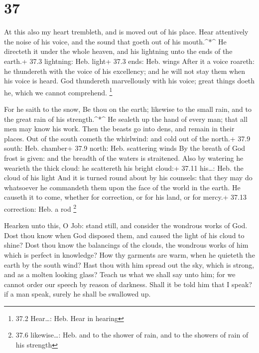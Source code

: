 \hypertarget{section-36}{%
\section{37}\label{section-36}}

 At this also my heart trembleth, and is moved out of his
place.  Hear attentively the noise of his voice, and the
sound that goeth out of his mouth.\^{}*\^{}  He directeth it
under the whole heaven, and his lightning unto the ends of the earth.+
37.3 lightning: Heb. light+ 37.3 ends: Heb. wings  After it
a voice roareth: he thundereth with the voice of his excellency; and he
will not stay them when his voice is heard.  God thundereth
marvellously with his voice; great things doeth he, which we cannot
comprehend. \footnote{37.2 Hear\ldots: Heb. Hear in hearing}

 For he saith to the snow, Be thou on the earth; likewise to
the small rain, and to the great rain of his strength.\^{}*\^{}
 He sealeth up the hand of every man; that all men may know
his work.  Then the beasts go into dens, and remain in their
places.  Out of the south cometh the whirlwind: and cold out
of the north.+ 37.9 south: Heb. chamber+ 37.9 north: Heb. scattering
winds  By the breath of God frost is given: and the breadth
of the waters is straitened.  Also by watering he wearieth
the thick cloud: he scattereth his bright cloud:+ 37.11 his\ldots: Heb.
the cloud of his light  And it is turned round about by his
counsels: that they may do whatsoever he commandeth them upon the face
of the world in the earth.  He causeth it to come, whether
for correction, or for his land, or for mercy.+ 37.13 correction: Heb. a
rod \footnote{37.6 likewise\ldots: Heb. and to the shower of rain, and
  to the showers of rain of his strength}

 Hearken unto this, O Job: stand still, and consider the
wondrous works of God.  Dost thou know when God disposed
them, and caused the light of his cloud to shine?  Dost
thou know the balancings of the clouds, the wondrous works of him which
is perfect in knowledge?  How thy garments are warm, when
he quieteth the earth by the south wind?  Hast thou with
him spread out the sky, which is strong, and as a molten looking glass?
 Teach us what we shall say unto him; for we cannot order
our speech by reason of darkness.  Shall it be told him
that I speak? if a man speak, surely he shall be swallowed up.

